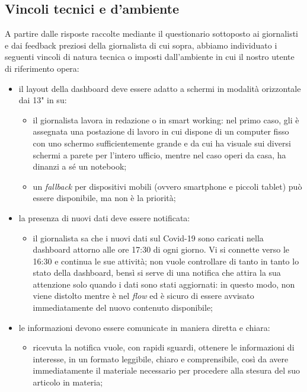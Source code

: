\subsection{Vincoli tecnici e d'ambiente}
\label{ss:vincoli-tecnici-ambiente}
A partire dalle risposte raccolte mediante il questionario sottoposto ai giornalisti e dai feedback preziosi della giornalista di cui sopra, abbiamo individuato i seguenti vincoli di natura tecnica o imposti dall'ambiente in cui il nostro utente di riferimento opera:
\begin{itemize}
    \item il layout della dashboard deve essere adatto a schermi in modalità orizzontale dai 13" in su:
    \begin{itemize}
        \item il giornalista lavora in redazione o in smart working: nel primo caso, gli è assegnata una postazione di lavoro in cui dispone di un computer fisso con uno schermo sufficientemente grande e da cui ha visuale sui diversi schermi a parete per l'intero ufficio, mentre nel caso operi da casa, ha dinanzi a sé un notebook; 
        \item un \textit{fallback} per dispositivi mobili (ovvero smartphone e piccoli tablet) può essere disponibile, ma non è la priorità;
    \end{itemize}
    \item la presenza di nuovi dati deve essere notificata:
    \begin{itemize}
        \item il giornalista sa che i nuovi dati sul Covid-19 sono caricati nella dashboard attorno alle ore 17:30 di ogni giorno. Vi si connette verso le 16:30 e continua le sue attività; non vuole controllare di tanto in tanto lo stato della dashboard, bensì si serve di una notifica che attira la sua attenzione solo quando i dati sono stati aggiornati: in questo modo, non viene distolto mentre è nel \textit{flow} ed è sicuro di essere avvisato immediatamente del nuovo contenuto disponibile;
    \end{itemize}
	\item le informazioni devono essere comunicate in maniera diretta e chiara:
	\begin{itemize}
        \item ricevuta la notifica vuole, con rapidi sguardi, ottenere le informazioni di interesse, in un formato leggibile, chiaro e comprensibile, così da avere immediatamente il materiale necessario per procedere alla stesura del suo articolo in materia;

\end{itemize}
\end{itemize}
